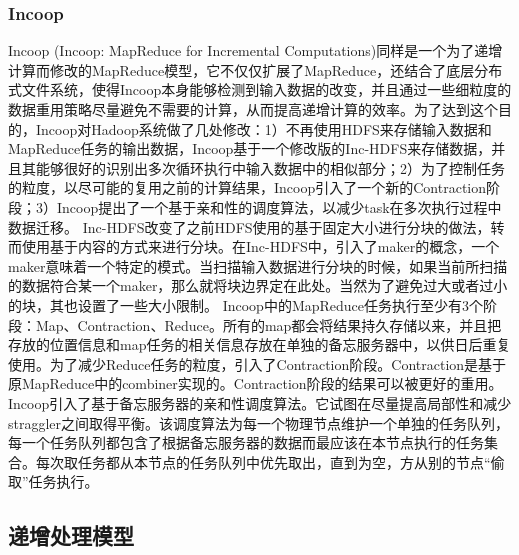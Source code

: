 \subsubsection{Incoop}
Incoop (Incoop: MapReduce for Incremental Computations)同样是一个为了递增计算而修改的MapReduce模型，它不仅仅扩展了MapReduce，还结合了底层分布式文件系统，使得Incoop本身能够检测到输入数据的改变，并且通过一些细粒度的数据重用策略尽量避免不需要的计算，从而提高递增计算的效率。为了达到这个目的，Incoop对Hadoop系统做了几处修改：1）不再使用HDFS来存储输入数据和MapReduce任务的输出数据，Incoop基于一个修改版的Inc-HDFS来存储数据，并且其能够很好的识别出多次循环执行中输入数据中的相似部分；2）为了控制任务的粒度，以尽可能的复用之前的计算结果，Incoop引入了一个新的Contraction阶段；3）Incoop提出了一个基于亲和性的调度算法，以减少task在多次执行过程中数据迁移。
  Inc-HDFS改变了之前HDFS使用的基于固定大小进行分块的做法，转而使用基于内容的方式来进行分块。在Inc-HDFS中，引入了maker的概念，一个maker意味着一个特定的模式。当扫描输入数据进行分块的时候，如果当前所扫描的数据符合某一个maker，那么就将块边界定在此处。当然为了避免过大或者过小的块，其也设置了一些大小限制。
  Incoop中的MapReduce任务执行至少有3个阶段：Map、Contraction、Reduce。所有的map都会将结果持久存储以来，并且把存放的位置信息和map任务的相关信息存放在单独的备忘服务器中，以供日后重复使用。为了减少Reduce任务的粒度，引入了Contraction阶段。Contraction是基于原MapReduce中的combiner实现的。Contraction阶段的结果可以被更好的重用。
  Incoop引入了基于备忘服务器的亲和性调度算法。它试图在尽量提高局部性和减少straggler之间取得平衡。该调度算法为每一个物理节点维护一个单独的任务队列，每一个任务队列都包含了根据备忘服务器的数据而最应该在本节点执行的任务集合。每次取任务都从本节点的任务队列中优先取出，直到为空，方从别的节点“偷取”任务执行。


\subsection{递增处理模型}
